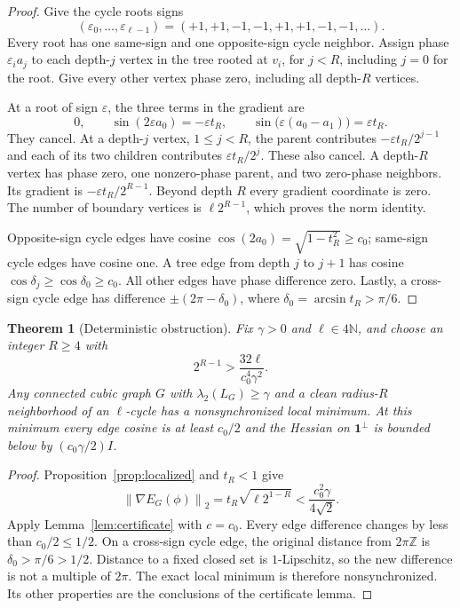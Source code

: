 \documentclass[11pt]{article}
\newtheorem{theorem}{Theorem}
\theoremstyle{definition}
\theoremstyle{remark}
\newcommand{\one}{\mathbf 1}
\newcommand{\norm}[1]{\left\lVert#1\right\rVert}
\newcommand{\asin}{\operatorname{arcsin}}
\begin{document}
\begin{proof}
Give the cycle roots signs
\[
 (\varepsilon_0,\ldots,\varepsilon_{\ell-1})
   =(+1,+1,-1,-1,+1,+1,-1,-1,\ldots).
\]
Every root has one same-sign and one opposite-sign cycle neighbor.
Assign phase $\varepsilon_i a_j$ to each depth-$j$ vertex in the tree rooted
at $v_i$, for $j<R$, including $j=0$ for the root. Give every other vertex
phase zero, including all depth-$R$ vertices.

At a root of sign $\varepsilon$, the three terms in the gradient are
\[
 0,\qquad \sin(2\varepsilon a_0)=-\varepsilon t_R,
 \qquad \sin\bigl(\varepsilon(a_0-a_1)\bigr)=\varepsilon t_R.
\]
They cancel. At a depth-$j$ vertex, $1\le j<R$, the parent contributes
$-\varepsilon t_R/2^{j-1}$ and each of its two children contributes
$\varepsilon t_R/2^j$. These also cancel. A depth-$R$ vertex has phase zero,
one nonzero-phase parent, and two zero-phase neighbors. Its gradient is
$-\varepsilon t_R/2^{R-1}$. Beyond depth $R$ every gradient coordinate is
zero. The number of boundary vertices is $\ell2^{R-1}$, which proves the
norm identity.

Opposite-sign cycle edges have cosine
$\cos(2a_0)=\sqrt{1-t_R^2}\ge c_0$; same-sign cycle edges have cosine one.
A tree edge from depth $j$ to $j+1$ has cosine
$\cos\delta_j\ge\cos\delta_0\ge c_0$. All other edges have phase difference
zero. Lastly, a cross-sign cycle edge has difference
$\pm(2\pi-\delta_0)$, where $\delta_0=\asin t_R>\pi/6$.
\end{proof}

\begin{theorem}[Deterministic obstruction]\label{thm:deterministic}
Fix $\gamma>0$ and $\ell\in4\mathbb N$, and choose an integer $R\ge4$ with
\begin{equation}\label{eq:chooseR}
 2^{R-1}>\frac{32\ell}{c_0^4\gamma^2}.
\end{equation}
Any connected cubic graph $G$ with $\lambda_2(L_G)\ge\gamma$ and a clean
radius-$R$ neighborhood of an $\ell$-cycle has a nonsynchronized local
minimum. At this minimum every edge cosine is at least $c_0/2$ and the
Hessian on $\one^\perp$ is bounded below by $(c_0\gamma/2)I$.
\end{theorem}

\begin{proof}
Proposition~\ref{prop:localized} and $t_R<1$ give
\[
 \norm{\nabla E_G(\phi)}_2=t_R\sqrt{\ell2^{1-R}}
            <\frac{c_0^2\gamma}{4\sqrt2}.
\]
Apply Lemma~\ref{lem:certificate} with $c=c_0$. Every edge difference changes
by less than $c_0/2\le1/2$. On a cross-sign cycle edge, the original distance
from $2\pi\mathbb Z$ is $\delta_0>\pi/6>1/2$. Distance to a fixed closed
set is $1$-Lipschitz, so the new difference is not a multiple of $2\pi$.
The exact local minimum is therefore nonsynchronized. Its other properties
are the conclusions of the certificate lemma.
\end{proof}
\end{document}
